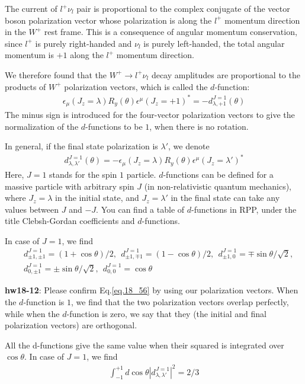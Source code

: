 \documentclass[12pt]{article}
\def\eps{\epsilon}
\def\lmd{\lambda}
\begin{document}
The current of $l^+ \nu_l$ pair is proportional to the complex conjugate
of the vector boson polarization vector whose polarization is along
the $l^+$ momentum direction in the $W^+$ rest frame. This is a consequence
of angular momentum conservation, since $l^+$ is purely right-handed and
$\nu_l$ is purely left-handed, the total angular momentum is $+1$ along the
$l^+$ momentum direction.

We therefore found that the $W^+ \to l^+ \nu_l$ decay amplitudes are
proportional to the products of $W^+$ polarization vectors, which is
called the $d$-function:
\begin{eqnarray}
    \eps_\mu(J_z=\lmd) R_y(\theta) \eps^\mu(J_z=+1)^*
= - d^{J=1}_{\lmd,+1}(\theta) \label{eq.18_54}
\end{eqnarray}
The minus sign is introduced for the four-vector polarization vectors
to give the normalization of the $d$-functions to be $1$, when there is
no rotation.

In general, if the final state polarization is $\lmd'$, we denote
\begin{eqnarray}
    d^{J=1}_{\lmd,\lmd'}(\theta)
= - \eps_\mu(J_z=\lmd) R_y(\theta) \eps^\mu(J_z=\lmd')^*\label{eq.18_55}
\end{eqnarray}
Here, $J=1$ stands for the spin $1$ particle. $d$-functions can be defined
for a massive particle with arbitrary spin $J$ (in non-relativistic
quantum mechanics), where $J_z=\lmd$ in the initial state, and $J_z=\lmd'$
in the final state can take any values between $J$ and $-J$. You can find
a table of $d$-functions in RPP, under the title Clebsh-Gordan
coefficients and $d$-functions.

In case of $J=1$, we find
\begin{eqnarray}\label{eq.18_56}
    &&d^{J=1}_{\pm1,\pm1} =  (1+\cos\theta)/2,~~
    d^{J=1}_{\pm1,\mp1} =  (1-\cos\theta)/2,~~
    d^{J=1}_{\pm1,   0} =  \mp \sin\theta/\sqrt2,~~\nonumber \\
    &&d^{J=1}_{   0,\pm1} =  \pm \sin\theta/\sqrt2,~~
    d^{J=1}_{   0,   0} =  \cos\theta
\end{eqnarray}

{\bf hw18-12}: Please confirm Eq.\ref{eq.18_56} by using our polarization
vectors. When the $d$-function is $1$, we find that the two polarization
vectors overlap perfectly, while when the $d$-function is zero, we say
that they (the initial and final polarization vectors) are orthogonal.

All the d-functions give the same value when their squared is integrated
over $\cos\theta$.  In case of $J=1$, we find
\begin{eqnarray}
    \int_{-1}^{+1} d\cos\theta |d^{J=1}_{\lmd,\lmd'}|^2 = 2/3 \label{eq.18_57}
\end{eqnarray}
\end{document}
